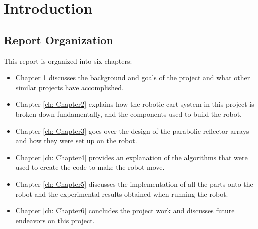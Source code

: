 \chapter{Introduction}
\label{ch: Chapter1}




\section{Report Organization}
This report is organized into six chapters:

\begin{itemize}
    \item Chapter \ref{ch: Chapter1} discusses the background and goals of the project and what other similar projects have accomplished.
    \item Chapter \ref{ch: Chapter2} explains how the robotic cart system in this project is broken down fundamentally, and the components used to build the robot.
    \item Chapter \ref{ch: Chapter3} goes over the design of the parabolic reflector arrays and how they were set up on the robot.
    \item Chapter \ref{ch: Chapter4} provides an explanation of the algorithms that were used to create the code to make the robot move.
    \item Chapter \ref{ch: Chapter5} discusses the implementation of all the parts onto the robot and the experimental results obtained when running the robot.
    \item Chapter \ref{ch: Chapter6} concludes the project work and discusses future endeavors on this project.
\end{itemize}

